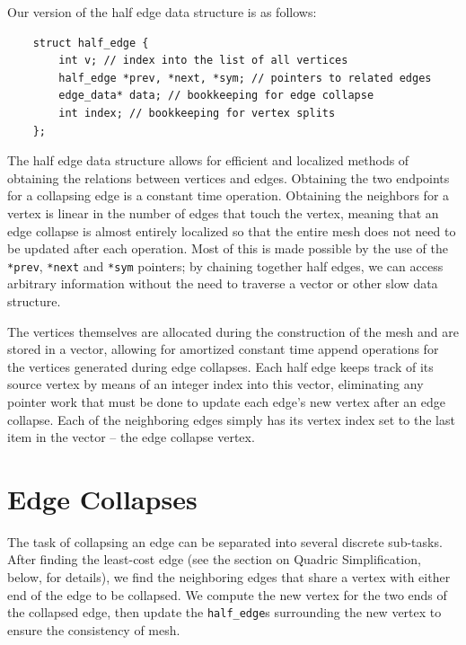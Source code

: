 \documentclass[11pt]{article}
\begin{document}
Our version of the half edge data structure is as follows:

\begin{verbatim}
    struct half_edge {
        int v; // index into the list of all vertices
        half_edge *prev, *next, *sym; // pointers to related edges
        edge_data* data; // bookkeeping for edge collapse
        int index; // bookkeeping for vertex splits
    };
\end{verbatim}

The half edge data structure allows for efficient and localized methods of
obtaining the relations between vertices and edges. Obtaining the two endpoints
for a collapsing edge is a constant time operation.  Obtaining the neighbors
for a vertex is linear in the number of edges that touch the vertex, meaning
that an edge collapse is almost entirely localized so that the entire mesh does
not need to be updated after each operation. Most of this is made possible by
the use of the \verb`*prev`, \verb`*next` and \verb`*sym` pointers; by chaining
together half edges, we can access arbitrary information without the need to
traverse a vector or other slow data structure.

The vertices themselves are allocated during the construction of the mesh and
are stored in a vector, allowing for amortized constant time append operations
for the vertices generated during edge collapses. Each half edge keeps track of
its source vertex by means of an integer index into this vector, eliminating
any pointer work that must be done to update each edge's new vertex after an
edge collapse. Each of the neighboring edges simply has its vertex index set to
the last item in the vector -- the edge collapse vertex.


\section{Edge Collapses}

The task of collapsing an edge can be separated into several discrete sub-tasks. After finding the 
least-cost edge (see the section on Quadric Simplification, below, for details), we find the neighboring
edges that share a vertex with either end of the edge to be collapsed. We compute the new vertex for
the two ends of the collapsed edge, then update the \verb`half_edge`s surrounding the new vertex
to ensure the consistency of mesh.
\end{document}
